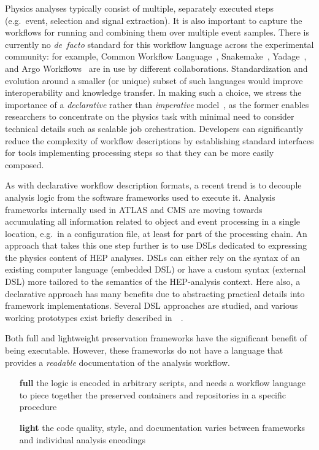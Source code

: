 \documentclass[11pt]{article}
\begin{document}
Physics analyses typically consist of multiple, separately executed steps (e.g.~event, selection and signal extraction). It is also important to capture the workflows for running and combining them over multiple event samples. There is currently no \emph{de~facto} standard for this workflow language across the experimental community: for example, Common Workflow Language~\cite{CWL}, Snakemake~\cite{SnakeMake}, Yadage~\cite{Cranmer:2017frf,yadage_code}, and Argo Workflows~\cite{argo} are in use by different collaborations. Standardization and evolution around a smaller (or unique) subset of such languages would improve interoperability and knowledge transfer. In making such a choice, we stress the importance of a \textsl{declarative} rather than \textsl{imperative} model~\cite{10.3389/fdata.2021.661501}, as the former enables researchers to concentrate on the physics task with minimal need to consider technical details such as scalable job orchestration. Developers can significantly reduce the complexity of workflow descriptions by establishing standard interfaces for tools implementing processing steps so that they can be more easily composed.

As with declarative workflow description formats, a recent trend is to decouple analysis logic from the software frameworks used to execute it. Analysis frameworks internally used in \gls{ATLAS} and \gls{CMS}
are moving towards accumulating all information related to object and event processing in a single location, e.g.~in a configuration file, at least for part of the processing chain. An approach that takes this one step further is to use \glspl{DSL} dedicated to expressing the physics content of \gls{HEP} analyses. \glspl{DSL} can either rely on the syntax of an existing computer language (embedded \gls{DSL}) or have a custom syntax (external \gls{DSL}) more tailored to the semantics of the \gls{HEP}-analysis context. Here also, a declarative approach has many benefits due to abstracting practical details into framework implementations. Several \gls{DSL} approaches are studied, and various working prototypes exist briefly described in~~\cite{Sekmen:2020vph}. 

Both full and lightweight preservation frameworks have the significant benefit of being executable. %
However, these frameworks do not have a language that provides a \emph{readable} documentation of the analysis workflow.
\begin{itemize}
    \item[\textbf{full}] the logic is encoded in arbitrary scripts, and needs a workflow language to piece together the preserved containers and repositories in a specific procedure
    \item[\textbf{light}] the code quality, style, and documentation varies between frameworks and individual analysis encodings
\end{itemize}
\end{document}
